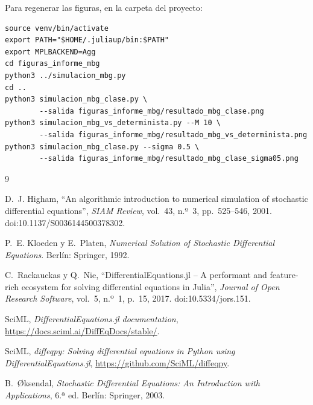 \documentclass[11pt,a4paper]{article}
\begin{document}
Para regenerar las figuras, en la carpeta del proyecto:
\begin{verbatim}
source venv/bin/activate
export PATH="$HOME/.juliaup/bin:$PATH"
export MPLBACKEND=Agg
cd figuras_informe_mbg
python3 ../simulacion_mbg.py
cd ..
python3 simulacion_mbg_clase.py \
        --salida figuras_informe_mbg/resultado_mbg_clase.png
python3 simulacion_mbg_vs_determinista.py --M 10 \
        --salida figuras_informe_mbg/resultado_mbg_vs_determinista.png
python3 simulacion_mbg_clase.py --sigma 0.5 \
        --salida figuras_informe_mbg/resultado_mbg_clase_sigma05.png
\end{verbatim}

\begin{thebibliography}{9}

\bibitem{higham}
D.~J. Higham, ``An algorithmic introduction to numerical simulation of stochastic differential equations'', \emph{SIAM Review}, vol.~43, n.º~3, pp.~525--546, 2001. doi:10.1137/S0036144500378302.

\bibitem{kloeden}
P.~E. Kloeden y E.~Platen, \emph{Numerical Solution of Stochastic Differential Equations}. Berlín: Springer, 1992.

C.~Rackauckas y Q.~Nie, ``DifferentialEquations.jl -- A performant and feature-rich ecosystem for solving differential equations in Julia'', \emph{Journal of Open Research Software}, vol.~5, n.º~1, p.~15, 2017. doi:10.5334/jors.151.

\bibitem{docsde}
SciML, \emph{DifferentialEquations.jl documentation}, \url{https://docs.sciml.ai/DiffEqDocs/stable/}.

SciML, \emph{diffeqpy: Solving differential equations in Python using DifferentialEquations.jl}, \url{https://github.com/SciML/diffeqpy}.

\bibitem{oksendal}
B.~Øksendal, \emph{Stochastic Differential Equations: An Introduction with Applications}, 6.ª ed. Berlín: Springer, 2003.

\end{thebibliography}
\end{document}
